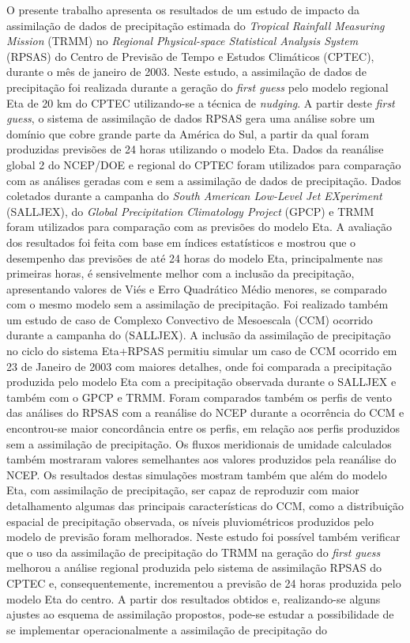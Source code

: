 \begin{resumo}
\hypertarget{estilo:abstract}{}

O presente trabalho apresenta os resultados de um estudo de impacto da assimilação de dados de precipitação estimada do \textit{Tropical Rainfall Measuring Mission} (TRMM) no \textit{Regional Physical-space Statistical Analysis System} (RPSAS) do Centro de Previsão de Tempo e Estudos Climáticos (CPTEC), durante  o mês de janeiro de 2003. Neste estudo, a assimilação de dados de precipitação foi realizada durante a geração do \textit{first guess} pelo modelo regional Eta de 20 km do CPTEC utilizando-se a técnica de \textit{nudging}. A partir deste \textit{first guess}, o sistema de assimilação de dados RPSAS gera uma análise sobre um domínio que cobre grande parte da América do Sul, a partir da qual foram produzidas previsões de 24 horas utilizando o modelo Eta. Dados da reanálise global 2 do NCEP/DOE e regional do CPTEC foram utilizados para comparação com as análises geradas com e sem a assimilação de dados de precipitação. Dados coletados durante a campanha do \textit{South American Low-Level Jet EXperiment} (SALLJEX), do \textit{Global Precipitation Climatology Project} (GPCP) e TRMM foram utilizados para comparação com as previsões do modelo Eta. A avaliação dos resultados foi feita com base em índices estatísticos e mostrou que o desempenho das previsões de até 24 horas do modelo Eta, principalmente nas primeiras horas, é sensivelmente melhor com a inclusão da precipitação, apresentando valores de Viés e Erro Quadrático Médio menores, se comparado com o mesmo modelo sem a assimilação de precipitação. Foi realizado também um estudo de caso de Complexo Convectivo de Mesoescala (CCM) ocorrido durante a campanha do (SALLJEX). A inclusão da assimilação de precipitação no ciclo do sistema Eta+RPSAS permitiu simular um caso de CCM ocorrido em 23 de Janeiro de 2003 com maiores detalhes, onde foi comparada a precipitação produzida pelo modelo Eta com a precipitação observada durante o SALLJEX e também com o GPCP e TRMM. Foram comparados também os perfis de vento das análises do RPSAS com a reanálise do NCEP durante a ocorrência do CCM e encontrou-se maior concordância entre os perfis, em relação aos perfis produzidos sem a assimilação de precipitação. Os fluxos meridionais de umidade calculados também mostraram valores semelhantes aos valores produzidos pela reanálise do NCEP. Os resultados destas simulações mostram também que além do modelo Eta, com assimilação de precipitação, ser capaz de reproduzir com maior detalhamento algumas das principais características do CCM, como a distribuição espacial de precipitação observada, os níveis pluviométricos produzidos pelo modelo de previsão foram melhorados. Neste estudo foi possível também verificar que o uso da assimilação de precipitação do TRMM na geração do \textit{first guess} melhorou a análise regional produzida pelo sistema de assimilação RPSAS do CPTEC e, consequentemente, incrementou a previsão de 24 horas produzida pelo modelo Eta do centro. A partir dos resultados obtidos e, realizando-se alguns ajustes ao esquema de assimilação propostos, pode-se estudar a possibilidade de se implementar operacionalmente a assimilação de precipitação do 
\end{resumo}
